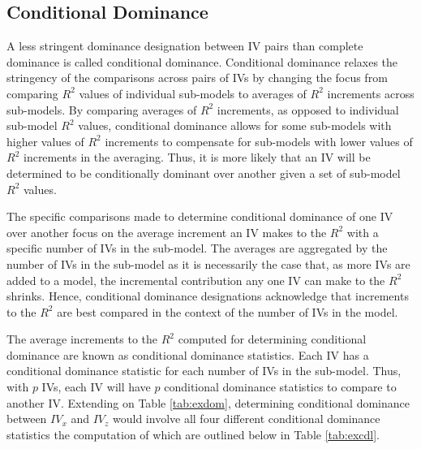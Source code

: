 \documentclass[ShortAfour,times,sageapa]{sagej}
\begin{document}
	\subsection{Conditional Dominance}
	
	A less stringent dominance designation between IV pairs than complete dominance is called conditional dominance.
	Conditional dominance relaxes the stringency of the comparisons across pairs of IVs by changing the focus from comparing $R^2$ values of individual sub-models to averages of $R^2$ increments across sub-models.
	By comparing averages of $R^2$ increments, as opposed to individual sub-model $R^2$ values, conditional dominance allows for some sub-models with higher values of $R^2$ increments to compensate for sub-models with lower values of $R^2$ increments in the averaging.
	Thus, it is more likely that an IV will be determined to be conditionally dominant over another given a set of sub-model $R^2$ values.
	
	The specific comparisons made to determine conditional dominance of one IV over another focus on the average increment an IV makes to the $R^2$ with a specific number of IVs in the sub-model.
	The averages are aggregated by the number of IVs in the sub-model as it is necessarily the case that, as more IVs are added to a model, the incremental contribution any one IV can make to the $R^2$ shrinks.
	Hence, conditional dominance designations acknowledge that increments to the $R^2$ are best compared in the context of the number of IVs in the model.	
	
	The average increments to the $R^2$ computed for determining conditional dominance are known as conditional dominance statistics.
	Each IV has a conditional dominance statistic for each number of IVs in the sub-model. 
	Thus, with $p$ IVs, each IV will have $p$ conditional dominance statistics to compare to another IV.
	Extending on Table \ref{tab:exdom}, determining conditional dominance between $IV_x$ and $IV_z$ would involve all four different conditional dominance statistics the computation of which are outlined below in Table \ref{tab:excdl}.
	
\end{document}
